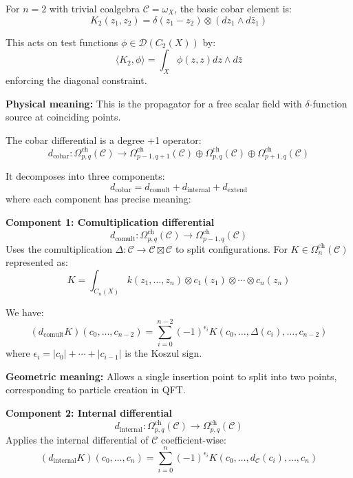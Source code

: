 \begin{example}\label{ex:simplest-cobar}
For $n=2$ with trivial coalgebra $\mathcal{C} = \omega_X$, the basic cobar element is:
$$K_2(z_1, z_2) = \delta(z_1 - z_2) \otimes (dz_1 \wedge d\bar{z}_1)$$

This acts on test functions $\phi \in \mathcal{D}(C_2(X))$ by:
$$\langle K_2, \phi \rangle = \int_X \phi(z, z) dz \wedge d\bar{z}$$
enforcing the diagonal constraint.

\textbf{Physical meaning:} This is the propagator for a free scalar field with 
$\delta$-function source at coinciding points.
\end{example}

\begin{theorem}\label{thm:cobar-diff-geom}
The cobar differential is a degree +1 operator:
$$d_{\text{cobar}}: \Omega^{\text{ch}}_{p,q}(\mathcal{C}) \to 
\Omega^{\text{ch}}_{p-1,q+1}(\mathcal{C}) \oplus \Omega^{\text{ch}}_{p,q}(\mathcal{C}) 
\oplus \Omega^{\text{ch}}_{p+1,q}(\mathcal{C})$$

It decomposes into three components:
\[
d_{\text{cobar}} = d_{\text{comult}} + d_{\text{internal}} + d_{\text{extend}}
\]
where each component has precise meaning:

\textbf{Component 1: Comultiplication differential}
$$d_{\text{comult}}: \Omega^{\text{ch}}_{p,q}(\mathcal{C}) \to 
\Omega^{\text{ch}}_{p-1,q}(\mathcal{C})$$
Uses the comultiplication $\Delta: \mathcal{C} \to \mathcal{C} \boxtimes \mathcal{C}$ 
to split configurations. For $K \in \Omega^{\text{ch}}_n(\mathcal{C})$ represented as:
$$K = \int_{C_n(X)} k(z_1, \ldots, z_n) \otimes c_1(z_1) \otimes \cdots \otimes c_n(z_n)$$

We have:
$$(d_{\text{comult}}K)(c_0, \ldots, c_{n-2}) = \sum_{i=0}^{n-2} (-1)^{\epsilon_i} 
K(c_0, \ldots, \Delta(c_i), \ldots, c_{n-2})$$
where $\epsilon_i = |c_0| + \cdots + |c_{i-1}|$ is the Koszul sign.

\textbf{Geometric meaning:} Allows a single insertion point to split into two points, 
corresponding to particle creation in QFT.

\textbf{Component 2: Internal differential}
$$d_{\text{internal}}: \Omega^{\text{ch}}_{p,q}(\mathcal{C}) \to 
\Omega^{\text{ch}}_{p,q}(\mathcal{C})$$
Applies the internal differential of $\mathcal{C}$ coefficient-wise:
$$(d_{\text{internal}}K)(c_0, \ldots, c_n) = \sum_{i=0}^n (-1)^{\epsilon_i} 
K(c_0, \ldots, d_{\mathcal{C}}(c_i), \ldots, c_n)$$


\end{theorem}
